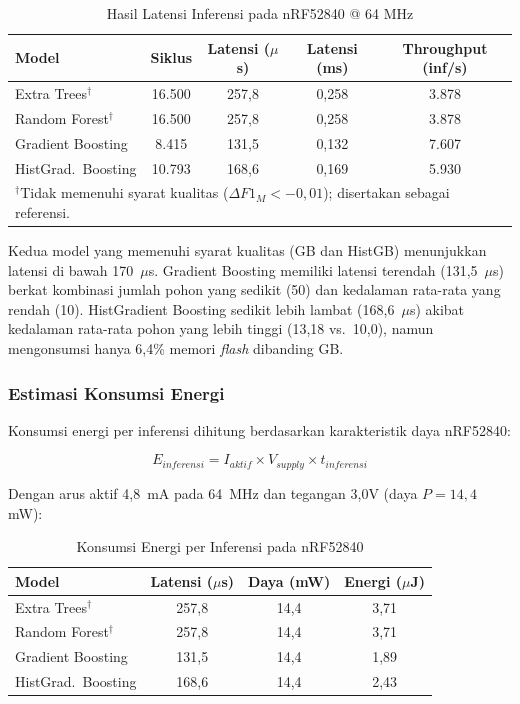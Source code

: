 \begin{table}[htbp]
\centering
\caption{Hasil Latensi Inferensi pada nRF52840 @ 64 MHz}
\label{tab:arm_latency}
\begin{tabular}{lcccc}
\hline
\textbf{Model} & \textbf{Siklus} & \textbf{Latensi ($\mu$s)} & \textbf{Latensi (ms)} & \textbf{Throughput (inf/s)} \\
\hline
Extra Trees$^{\dagger}$ & 16.500 & 257,8 & 0,258 & 3.878 \\
Random Forest$^{\dagger}$ & 16.500 & 257,8 & 0,258 & 3.878 \\
Gradient Boosting & 8.415 & 131,5 & 0,132 & 7.607 \\
HistGrad.\ Boosting & 10.793 & 168,6 & 0,169 & 5.930 \\
\hline
\multicolumn{5}{l}{\footnotesize $^{\dagger}$Tidak memenuhi syarat kualitas ($\Delta F1_M < -0{,}01$); disertakan sebagai referensi.}
\end{tabular}
\end{table}

Kedua model yang memenuhi syarat kualitas (GB dan HistGB) menunjukkan latensi di bawah 170~$\mu$s. Gradient Boosting memiliki latensi terendah (131,5~$\mu$s) berkat kombinasi jumlah pohon yang sedikit (50) dan kedalaman rata-rata yang rendah (10). HistGradient Boosting sedikit lebih lambat (168,6~$\mu$s) akibat kedalaman rata-rata pohon yang lebih tinggi (13,18 vs.\ 10,0), namun mengonsumsi hanya 6,4\% memori \textit{flash} dibanding GB.

\subsubsection{Estimasi Konsumsi Energi}

Konsumsi energi per inferensi dihitung berdasarkan karakteristik daya nRF52840:

\begin{equation}
    E_{inferensi} = I_{aktif} \times V_{supply} \times t_{inferensi}
\end{equation}

Dengan arus aktif 4,8~mA pada 64~MHz dan tegangan 3,0V (daya $P = 14{,}4$ mW):

\begin{table}[htbp]
\centering
\caption{Konsumsi Energi per Inferensi pada nRF52840}
\label{tab:arm_energy}
\begin{tabular}{lccc}
\hline
\textbf{Model} & \textbf{Latensi ($\mu$s)} & \textbf{Daya (mW)} & \textbf{Energi ($\mu$J)} \\
\hline
Extra Trees$^{\dagger}$ & 257,8 & 14,4 & 3,71 \\
Random Forest$^{\dagger}$ & 257,8 & 14,4 & 3,71 \\
Gradient Boosting & 131,5 & 14,4 & 1,89 \\
HistGrad.\ Boosting & 168,6 & 14,4 & 2,43 \\
\hline
\end{tabular}
\end{table}


